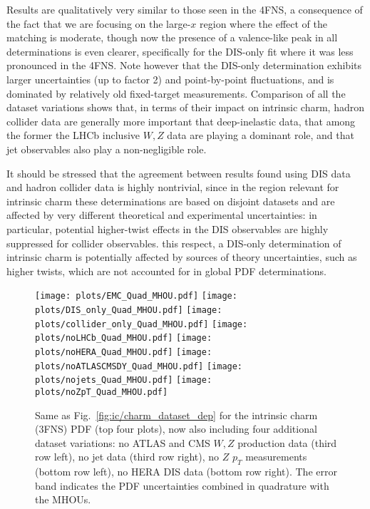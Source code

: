 Results are qualitatively very similar to those seen in the 4FNS, a
consequence of the fact that we are focusing on the large-$x$ region where the
effect of the matching is moderate, though now the presence of a
valence-like peak in all determinations is even clearer, specifically
for the DIS-only fit where it was less pronounced in the 4FNS.
%
 Note however that the DIS-only determination
  exhibits larger uncertainties
  (up to factor 2) and point-by-point fluctuations,
  and is dominated by relatively old fixed-target measurements.
%
Comparison of all the dataset variations shows that, in terms of their
impact on intrinsic charm,
hadron collider data are generally more important
that deep-inelastic data, that among the former the
LHCb inclusive $W,Z$ data are playing a dominant role,
and that jet observables also play a non-negligible role.

It should be stressed that the agreement between results found using
DIS data and hadron collider data is highly nontrivial, since in the region
relevant for intrinsic charm these determinations are based on disjoint datasets
and are  affected by
very different theoretical and experimental uncertainties:
in particular, potential higher-twist
effects in the DIS observables are highly suppressed for collider observables.
%
 this respect, a DIS-only determination of intrinsic charm
  is potentially affected by sources of theory uncertainties, such as higher twists,
which are not accounted for in global PDF determinations.

\begin{figure}[h]
  \begin{center}
    \texttt{[image: plots/EMC\_Quad\_MHOU.pdf]}
    \texttt{[image: plots/DIS\_only\_Quad\_MHOU.pdf]}
    \texttt{[image: plots/collider\_only\_Quad\_MHOU.pdf]}
    \texttt{[image: plots/noLHCb\_Quad\_MHOU.pdf]}
    \texttt{[image: plots/noHERA\_Quad\_MHOU.pdf]}
    \texttt{[image: plots/noATLASCMSDY\_Quad\_MHOU.pdf]}
    \texttt{[image: plots/nojets\_Quad\_MHOU.pdf]}
    \texttt{[image: plots/noZpT\_Quad\_MHOU.pdf]}
    \caption{\small Same as Fig.~\ref{fig:ic/charm_dataset_dep}
      for the intrinsic charm (3FNS) PDF (top four plots), now also including
      four additional dataset variations:  no ATLAS and CMS $W, Z$
      production data   (third row left),
      no jet data (third row right), no $Z$ $p_T$
      measurements (bottom row left), no HERA
      DIS data (bottom row right).
The error band indicates the PDF uncertainties combined in quadrature with the MHOUs.
\label{fig:ic/charm_dataset_dep_nf3} }
\end{center}
\end{figure}


